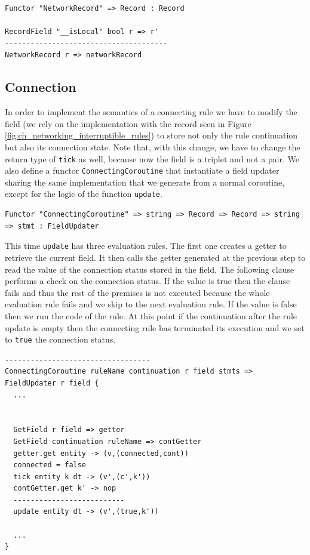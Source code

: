 \begin{lstlisting}
Functor "NetworkRecord" => Record : Record 

RecordField "__isLocal" bool r => r'
--------------------------------------
NetworkRecord r => networkRecord
\end{lstlisting}

\subsection{Connection}
\label{subsec:ch_networking_connection}
In order to implement the semantics of a connecting rule we have to modify the field (we rely on the implementation with the record seen in Figure \ref{fig:ch_networking_interruptible_rules}) to store not only the rule continuation but also its connection state. Note that, with this change, we have to change the return type of \texttt{tick} as well, because now the field is a triplet and not a pair. We also define a functor \texttt{ConnectingCoroutine} that instantiate a field updater sharing the same implementation that we generate from a normal coroutine, except for the logic of the function \texttt{update}. 

\begin{lstlisting}
Functor "ConnectingCoroutine" => string => Record => Record => string => stmt : FieldUpdater
\end{lstlisting}

\noindent
This time \texttt{update} has three evaluation rules. The first one creates a getter to retrieve the current field. It then calls the getter generated at the previous step to read the value of the connection status stored in the field. The following clause performs a check on the connection status. If the value is true then the clause fails and thus the rest of the premises is not executed because the whole evaluation rule fails and we skip to the next evaluation rule. If the value is false then we run the code of the rule. At this point if the continuation after the rule update is empty then the connecting rule has terminated its execution and we set to \texttt{true} the connection status. 

\begin{lstlisting}
----------------------------------
ConnectingCoroutine ruleName continuation r field stmts => FieldUpdater r field {
  ...
  
  
  GetField r field => getter
  GetField continuation ruleName => contGetter
  getter.get entity -> (v,(connected,cont))
  connected = false
  tick entity k dt -> (v',(c',k'))
  contGetter.get k' -> nop
  --------------------------
  update entity dt -> (v',(true,k'))
  
  ...
}
\end{lstlisting}

